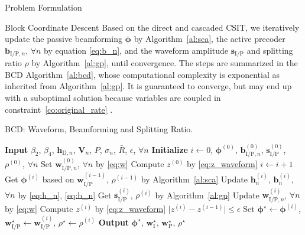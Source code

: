 \documentclass[journal,12pt,onecolumn,draftclsnofoot]{IEEEtran}
\begin{document}
\begin{section}{Problem Formulation}
		\begin{subsection}{Block Coordinate Descent}
			Based on the direct and cascaded CSIT, we iteratively update the passive beamforming $\boldsymbol{\phi}$ by Algorithm~\ref{al:sca}, the active precoder $\boldsymbol{b}_{\mathrm{I/P},n}$, $\forall n$ by equation \eqref{eq:b_n}, and the waveform amplitude $\boldsymbol{s}_{\mathrm{I/P}}$ and splitting ratio $\rho$ by Algorithm~\ref{al:gp}, until convergence. The steps are summarized in the BCD Algorithm~\ref{al:bcd}, whose computational complexity is exponential as inherited from Algorithm~\ref{al:gp}. It is guaranteed to converge, but may end up with a suboptimal solution because variables are coupled in constraint~\eqref{co:original_rate} \cite{Grippo2000}.

			\begin{algorithm}[!t]
				\caption{BCD: Waveform, Beamforming and Splitting Ratio.}
				\label{al:bcd}
				\begin{algorithmic}[1]
					\State \textbf{Input} $\beta_2$, $\beta_4$, $\boldsymbol{h}_{\mathrm{D},n}$, $\boldsymbol{V}_{n}$, $P$, $\sigma_n$, $\bar{R}$, $\epsilon$, $\forall n$
					\State \textbf{Initialize} $i \gets 0$, $\boldsymbol{\phi}^{(0)}$, $\boldsymbol{b}_{\mathrm{I/P},n}^{(0)}$, $\boldsymbol{s}_{\mathrm{I/P}}^{(0)}$, $\rho^{(0)}$, $\forall n$
					\State Set $\boldsymbol{w}_{\mathrm{I/P},n}^{(0)}$, $\forall n$ by \eqref{eq:w}
					\State Compute $z^{(0)}$ by \eqref{eq:z_waveform}
					\Repeat
						\State $i \gets i + 1$
						\State Get $\boldsymbol{\phi}^{(i)}$ based on $\boldsymbol{w}_{\mathrm{I/P}}^{(i-1)}$, $\rho^{(i-1)}$ by Algorithm~\ref{al:sca}
						\State Update $\boldsymbol{h}_n^{(i)}$, $\boldsymbol{b}_n^{(i)}$, $\forall n$ by \eqref{eq:h_n}, \eqref{eq:b_n}
						\State Get $\boldsymbol{s}_{\mathrm{I/P}}^{(i)}$, $\rho^{(i)}$ by Algorithm~\ref{al:gp}
						\State Update $\boldsymbol{w}_{\mathrm{I/P},n}^{(i)}$, $\forall n$ by \eqref{eq:w}
						\State Compute $z^{(i)}$ by \eqref{eq:z_waveform}
					\Until $\lvert z^{(i)} - z^{(i-1)} \rvert \le \epsilon$
					\State Set $\boldsymbol{\phi}^{\star} \gets \boldsymbol{\phi}^{(i)}$, $\boldsymbol{w}_{\mathrm{I/P}}^{\star} \gets \boldsymbol{w}_{\mathrm{I/P}}^{(i)}$, $\rho^{\star} \gets \rho^{(i)}$
					\State \textbf{Output} $\boldsymbol{\phi}^{\star}$, $\boldsymbol{w}_{\mathrm{I}}^{\star}$, $\boldsymbol{w}_{\mathrm{P}}^{\star}$, $\rho^{\star}$
				\end{algorithmic}
			\end{algorithm}


\end{subsection}
\end{section}
\end{document}

